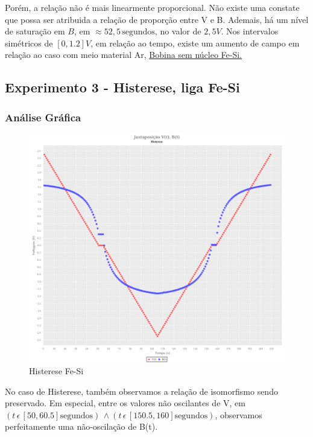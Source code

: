 \documentclass[11pt]{article}
\begin{document}
Porém, a relação não é mais linearmente proporcional.  Não existe uma constate que possa ser atribuida a relação de proporção entre V e B. Ademais, há um nível de saturação em \(B\), em \(\approx 52,5 \, \textrm{segundos}\), no valor de \(2,5 V\). Nos intervalos simétricos de \([0, 1.2] V\), em relação ao tempo, existe um aumento de campo em relação ao caso com meio material Ar, \hyperref[sec:org4ef7571]{Bobina sem núcleo Fe-Si.}

\subsection{Experimento 3 - Histerese, liga Fe-Si}
\label{sec:org30e28f0}

\subsubsection{Análise Gráfica}
\label{sec:org34a6338}
{\begin{figure}[htbp]

\includegraphics[width=.9\linewidth]{img-plots/V-B-justaposicao-histerese.png}
\caption{Histerese Fe-Si}
\end{figure}}

No caso de Histerese, também observamos a relação de  isomorfismo sendo preservado. Em especial, entre os valores não oscilantes de V, em \((t \, \epsilon \, [50, 60.5] \textrm{segundos}) \, \land (t \, \epsilon \, [150.5, 160] \textrm{segundos})\), observamos perfeitamente uma não-oscilação de B(t).
\end{document}
